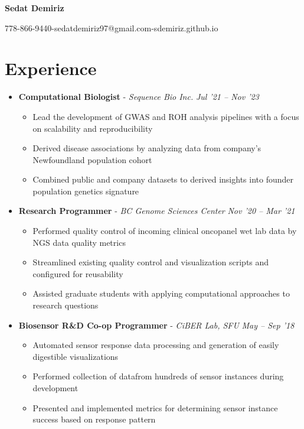 \documentclass{article}
\makeatletter
\newcommand{\name}{Sedat Demiriz}
\newcommand{\email}{sedatdemiriz97@gmail.com}
\newcommand{\phone}{778-866-9440}
\newcommand{\website}{sdemiriz.github.io}
\newcommand{\experienceheader}[3]{\item \textbf{#1} - \textit{#2} \hfill \textit{#3} \vspace{-.2em}}
\newcommand{\customsection}[1]{\section*{#1} \vspace{-1em} \hrulefill \vspace{-.5em}}
\makeatother
\begin{document}
\begin{minipage}[t]{1\textwidth} 
  \centering \Huge 
  \textbf{\name} \vspace{.5em} 
\end{minipage}
\begin{minipage}[t]{1\textwidth} 
  \centering \normalsize 
  \phone\hspace{0.5em}-\hspace{0.5em}\email\hspace{0.5em}-\hspace{0.5em}\website
\end{minipage}

\customsection{Experience}
\begin{itemize}
  \experienceheader{Computational Biologist}{Sequence Bio Inc.}{Jul '21 -- Nov '23}
    \begin{itemize}
      \item Lead the development of GWAS and ROH analysis pipelines with a focus on scalability and reproducibility
      \item Derived disease associations by analyzing data from company's Newfoundland population cohort
      \item Combined public and company datasets to derived insights into founder population genetics signature
    \end{itemize}
  \experienceheader{Research Programmer}{BC Genome Sciences Center}{Nov '20 -- Mar '21}
    \begin{itemize}
      \item Performed quality control of incoming clinical oncopanel wet lab data by NGS data quality metrics
      \item Streamlined existing quality control and visualization scripts and configured for reusability
      \item Assisted graduate students with applying computational approaches to research questions
    \end{itemize}
  \experienceheader{Biosensor R\&D Co-op Programmer}{CiBER Lab, SFU}{May -- Sep '18}
    \begin{itemize}
      \item Automated sensor response data processing and generation of easily digestible visualizations
      \item Performed collection of datafrom hundreds of sensor instances during development
      \item Presented and implemented metrics for determining sensor instance success based on response pattern

\end{itemize}
\end{itemize}
\end{document}
